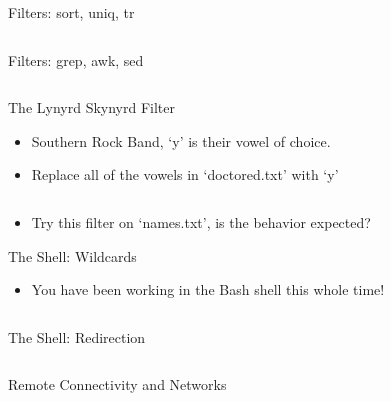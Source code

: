 \documentclass[hyperref={pdfpagelabels=false},12pt]{beamer}
\begin{document}
\begin{frame}{Filters: sort, uniq, tr}
\inputminted[bgcolor=lightgray,linenos,fontsize=\footnotesize]{bash}{code/simple-filters-2.txt}
\end{frame}

\begin{frame}{Filters: grep, awk, sed}
\inputminted[bgcolor=lightgray,linenos,fontsize=\footnotesize]{bash}{code/simple-filters-3.txt}
\end{frame}

\begin{frame}{The Lynyrd Skynyrd Filter}
\begin{itemize}
    \item Southern Rock Band, `y' is their vowel of choice.
    \item Replace all of the vowels in `doctored.txt' with `y'
\end{itemize}
\inputminted[bgcolor=lightgray,linenos,fontsize=\footnotesize]{bash}{code/simple-filters-4.txt}
\begin{itemize}
    \item Try this filter on `names.txt', is the behavior expected?
\end{itemize}
\end{frame}

\begin{frame}{The Shell: Wildcards}
\begin{itemize}
    \item You have been working in the Bash shell this whole time!
\end{itemize}
\inputminted[bgcolor=lightgray,linenos,fontsize=\footnotesize]{bash}{code/shell-1.txt}
\end{frame}

\begin{frame}{The Shell: Redirection}
\inputminted[bgcolor=lightgray,linenos,fontsize=\footnotesize]{bash}{code/shell-2.txt}
\end{frame}

\begin{frame}{Remote Connectivity and Networks}
\inputminted[bgcolor=lightgray,linenos,fontsize=\footnotesize]{bash}{code/ssh-config-1.txt}
\end{frame}

\end{document}
